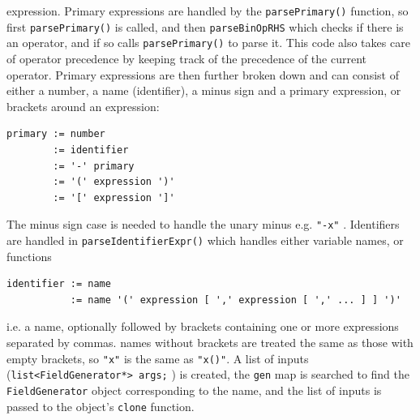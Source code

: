 \documentclass[12pt]{article}
\begin{document}
expression. Primary expressions are handled by the
%
\lstinline!parsePrimary()! function, so first \lstinline!parsePrimary()!
%
 is called, and then
%
\lstinline!parseBinOpRHS!
%
 which checks if there is an operator, and if so calls
%
\lstinline!parsePrimary()!
%
 to parse it. This code also takes care of operator precedence by keeping track
 of the precedence of the current operator. Primary expressions are then
 further broken down and can consist of either a number, a name (identifier), a
 minus sign and a primary expression, or brackets around an  expression:
%
\begin{verbatim}
primary := number
        := identifier
        := '-' primary
        := '(' expression ')'
        := '[' expression ']'
\end{verbatim}
%
The minus sign case is needed to handle the unary minus e.g.
%
\lstinline!"-x"!
%
. Identifiers are handled in
%
\lstinline!parseIdentifierExpr()!
%
 which handles either variable names, or functions
%
\begin{verbatim}
identifier := name
           := name '(' expression [ ',' expression [ ',' ... ] ] ')'
\end{verbatim}
%
i.e. a name, optionally followed by brackets containing one or more expressions
separated by commas.  names without brackets are treated the same as those with
empty brackets, so
%
\lstinline!"x"!
%
 is the same as
%
\lstinline!"x()"!. A list of inputs (\lstinline!list<FieldGenerator*> args;!
%
) is created, the
%
\lstinline!gen! map is searched to find the \lstinline!FieldGenerator!
%
 object corresponding to the name, and the list of inputs is passed to the
 object's
%
\lstinline!clone!
%
 function.
\end{document}
